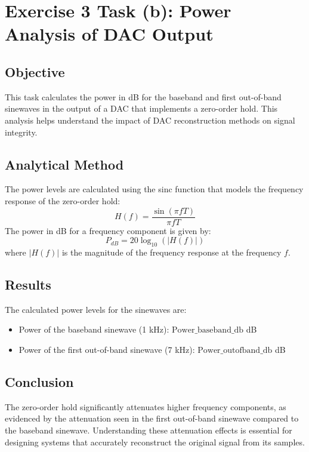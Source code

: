 \item[(b)]
\section*{Exercise 3 Task (b): Power Analysis of DAC Output}

\subsection*{Objective}
This task calculates the power in dB for the baseband and first out-of-band sinewaves in the output of a DAC that implements a zero-order hold. This analysis helps understand the impact of DAC reconstruction methods on signal integrity.

\subsection*{Analytical Method}
The power levels are calculated using the sinc function that models the frequency response of the zero-order hold:
\[
H(f) = \frac{\sin(\pi f T)}{\pi f T}
\]
The power in dB for a frequency component is given by:
\[
P_{dB} = 20 \log_{10}(|H(f)|)
\]
where \(|H(f)|\) is the magnitude of the frequency response at the frequency \(f\).

\subsection*{Results}
The calculated power levels for the sinewaves are:
\begin{itemize}
\item Power of the baseband sinewave (1 kHz): \( \text{Power\_baseband\_db} \) dB
\item Power of the first out-of-band sinewave (7 kHz): \( \text{Power\_outofband\_db} \) dB
\end{itemize}

\subsection*{Conclusion}
The zero-order hold significantly attenuates higher frequency components, as evidenced by the attenuation seen in the first out-of-band sinewave compared to the baseband sinewave. Understanding these attenuation effects is essential for designing systems that accurately reconstruct the original signal from its samples.
